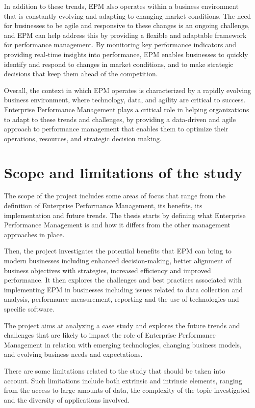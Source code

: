 \documentclass[12pt,a4paper,openright,twoside]{book}
\begin{document}
In addition to these trends, EPM also operates within a business environment that is constantly evolving and adapting to changing market conditions. 
%
The need for businesses to be agile and responsive to these changes is an ongoing challenge, and EPM can help address this by providing a flexible and adaptable framework for performance management. 
%
By monitoring key performance indicators and providing real-time insights into performance, EPM enables businesses to quickly identify and respond to changes in market conditions, and to make strategic decisions that keep them ahead of the competition.

Overall, the context in which EPM operates is characterized by a rapidly evolving business environment, where technology, data, and agility are critical to success. 
%
Enterprise Performance Management plays a critical role in helping organizations to adapt to these trends and challenges, by providing a data-driven and agile approach to performance management that enables them to optimize their operations, resources, and strategic decision making.

\section{Scope and limitations of the study}

The scope of the project includes some areas of focus that range from the definition of Enterprise Performance Management, its benefits, its implementation and future trends.
%
The thesis starts by defining what Enterprise Performance Management is and how it differs from the other management approaches in place.

Then, the project investigates the potential benefits that EPM can bring to modern businesses including enhanced decision-making, better alignment of business objectives with strategies, increased efficiency and improved performance.
%
It then explores the challenges and best practices associated with implementing EPM in businesses including issues related to data collection and analysis, performance measurement, reporting and the use of technologies and specific software.

The project aims at analyzing a case study and explores the future trends and challenges that are likely to impact the role of Enterprise Performance Management in relation with emerging technologies, changing business models, and evolving business needs and expectations.

There are some limitations related to the study that should be taken into account.
%
Such limitations include both extrinsic and intrinsic elements, ranging from the access to large amounts of data, the complexity of the topic investigated and the diversity of applications involved.
\end{document}
